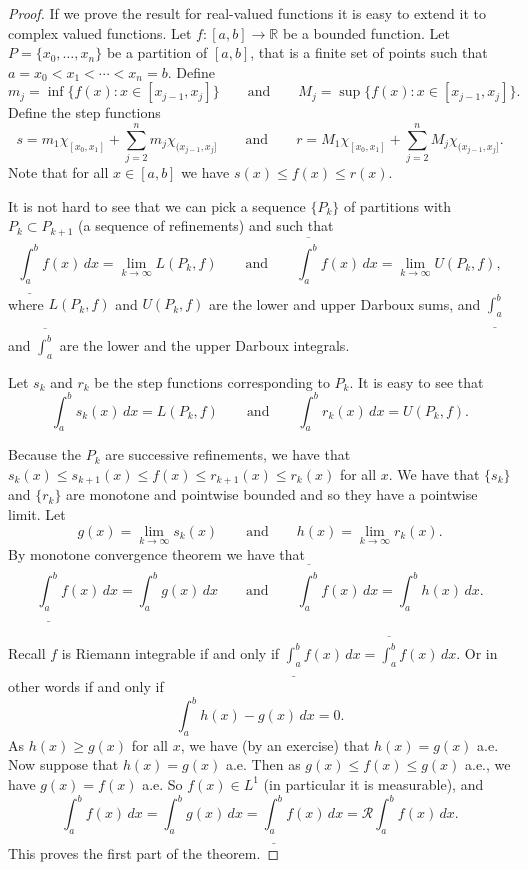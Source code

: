 \documentclass[12pt]{book}
\newcommand{\R}{{\mathbb{R}}}
\newcommand{\sR}{{\mathcal{R}}}
\theoremstyle{plain}
\theoremstyle{remark}
\theoremstyle{definition}
\theoremstyle{exercise}
\theoremstyle{example}
\begin{document}
\begin{proof}
If we prove the result for real-valued functions it is easy to extend it to
complex valued functions.
Let $f \colon [a,b] \to \R$ be a bounded function.
Let $P = \{ x_0,\ldots,x_n \}$ be a partition of $[a,b]$, that is a finite
set of points such that
$a = x_0 < x_1 < \cdots < x_n = b$.  Define
$$
m_j = \inf \{ f(x) : x \in [x_{j-1},x_j] \}
\qquad \text{and} \qquad
M_j = \sup \{ f(x) : x \in [x_{j-1},x_j] \}.
$$
Define the step functions
$$
s = m_1 \chi_{[x_0,x_1]}+\sum_{j=2}^n m_j \chi_{(x_{j-1},x_j]}
\qquad \text{and} \qquad
r = M_1 \chi_{[x_0,x_1]}+\sum_{j=2}^n M_j \chi_{(x_{j-1},x_j]} .
$$
Note that for all $x \in [a,b]$ we have $s(x) \leq f(x) \leq r(x)$.

It is not hard to see that we can pick
a sequence $\{ P_k \}$
of partitions with $P_k \subset P_{k+1}$ (a sequence of refinements) and
such that
$$
\underline{\int_a^b} f(x)\,dx = \lim_{k\to\infty} L(P_k,f)
\qquad \text{and} \qquad
\overline{\int_a^b} f(x)\,dx = \lim_{k\to\infty} U(P_k,f) ,
$$
where $L(P_k,f)$ and $U(P_k,f)$ are the lower and upper Darboux sums,
and
$\underline{\int_a^b}$ and
$\overline{\int_a^b}$ are the lower and the upper Darboux integrals.

Let $s_k$ and $r_k$ be the step functions corresponding to $P_k$.  It is
easy
to see that
$$
\int_a^b s_k(x) \, dx = L(P_k,f) \qquad \text{and} \qquad
\int_a^b r_k(x) \, dx = U(P_k,f) .
$$

Because the $P_k$ are successive refinements, we have that $s_k(x) \leq
s_{k+1}(x) \leq f(x) \leq r_{k+1}(x) \leq r_k(x)$ for all $x$.
We have that $\{ s_k \}$ and $\{ r_k \}$ are monotone and pointwise bounded and
so they
have a pointwise limit.  Let
$$
g(x) = \lim_{k\to\infty} s_k(x) \qquad \text{and} \qquad
h(x) = \lim_{k\to\infty} r_k(x) .
$$
By monotone convergence theorem we have that 
$$
\underline{\int_a^b} f(x)\,dx = \int_a^b g(x) \,dx
\qquad \text{and} \qquad
\overline{\int_a^b} f(x)\,dx = \int_a^b h(x) \,dx .
$$

Recall $f$ is Riemann integrable if and only if
$\underline{\int_a^b} f(x)\,dx = \overline{\int_a^b} f(x)\,dx$.  Or in other
words if and only if
$$
\int_a^b h(x)-g(x) \, dx = 0 .
$$
As $h(x) \geq g(x)$ for all $x$, we have (by an exercise) that
$h(x) = g(x)$ a.e.  Now suppose that $h(x) = g(x)$ a.e.  Then as $g(x) \leq f(x)
\leq g(x)$ a.e., we have $g(x) = f(x)$ a.e.  So $f(x) \in L^1$ (in particular
it is measurable), and
$$
\int_a^b f(x)\, dx =
\int_a^b g(x)\, dx =
\underline{\int_a^b} f(x)\,dx
=
\sR \!\! \int_a^b f(x)\, dx .
$$
This proves the first part of the theorem.


\end{proof}
\end{document}
